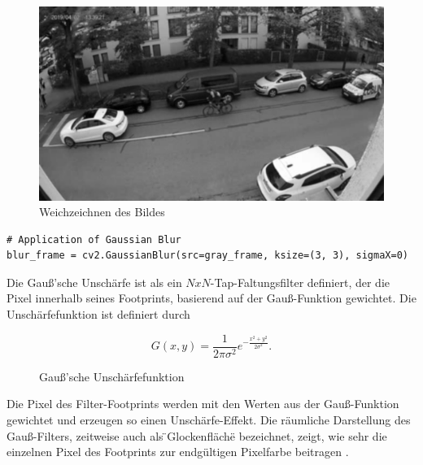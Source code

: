 \begin{figure}[htb]
	\centering
	\includegraphics[width=.9\textwidth]{images/abbildung_blur}
	\caption{Weichzeichnen des Bildes}
	\label{fig:blur}
\end{figure}

\vspace*{10mm}
\begin{lstlisting}[caption={Anwendung des Weichzeichners}, label={lst:gaussianblur}]
# Application of Gaussian Blur
blur_frame = cv2.GaussianBlur(src=gray_frame, ksize=(3, 3), sigmaX=0)
\end{lstlisting}

Die Gauß'sche Unschärfe ist als ein $NxN$-Tap-Faltungsfilter definiert, der die Pixel innerhalb seines Footprints, basierend auf der Gauß-Funktion gewichtet. Die Unschärfefunktion ist definiert durch 

\begin{figure}[htb]
	\[G(x,y) = \frac{1}{2\pi \sigma^2}e^{-\frac{x^2+y^2}{2\sigma^2}}.\]
	\caption{Gauß'sche Unschärfefunktion}
	\label{eq:gaussian}
\end{figure}

Die Pixel des Filter-Footprints werden mit den Werten aus der Gauß-Funktion gewichtet und erzeugen so einen Unschärfe-Effekt. Die räumliche Darstellung des Gauß-Filters, zeitweise auch als \"{}Glockenfläche\"{} bezeichnet, zeigt, wie sehr die einzelnen Pixel des Footprints zur endgültigen Pixelfarbe beitragen \cite{rastergrid}.

